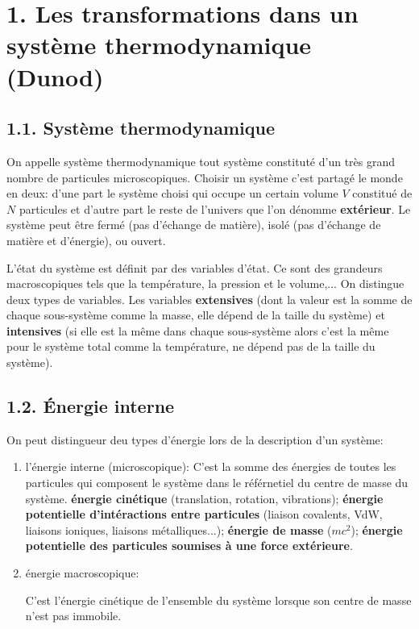 \documentclass[french, a4paper, 10pt, twocolumn, landscape]{article}
\begin{document}
\section*{1. Les transformations dans un système thermodynamique (Dunod)}

\subsection*{1.1. Système thermodynamique}

On appelle système thermodynamique tout système constituté d'un très grand nombre de particules microscopiques. Choisir un système c'est partagé le monde en deux: d'une part le système choisi qui occupe un certain volume $V$ constitué de $N$ particules et d'autre part le reste de l'univers que l'on dénomme \textbf{extérieur}. Le système peut être fermé (pas d'échange de matière), isolé (pas d'échange de matière et d'énergie), ou ouvert.

L'état du système est définit par des variables d'état. Ce sont des grandeurs macroscopiques tels que la température, la pression et le volume,... On distingue deux types de variables. Les variables \textbf{extensives} (dont la valeur est la somme de chaque sous-système comme la masse, elle dépend de la taille du système) et \textbf{intensives} (si elle est la même dans chaque sous-système alors c'est la même pour le système total comme la température, ne dépend pas de la taille du système).

\subsection*{1.2. Énergie interne}

On peut distingueur deu types d'énergie lors de la description d'un système:
\begin{enumerate}
    \item l'énergie interne (microscopique):
C'est la somme des énergies de toutes les particules qui composent le système dans le référnetiel du centre de masse du système. \textbf{énergie cinétique} (translation, rotation, vibrations); \textbf{énergie potentielle d'intéractions entre particules} (liaison covalents, VdW, liaisons ioniques, liaisons métalliques...); \textbf{énergie de masse} ($mc^2$); \textbf{énergie potentielle des particules soumises à une force extérieure}.
    \item énergie macroscopique:

C'est l'énergie cinétique de l'ensemble du système lorsque son centre de masse n'est pas immobile.
\end{enumerate}
\end{document}
